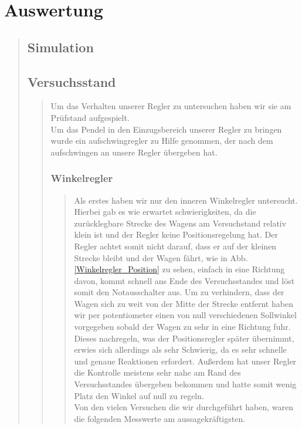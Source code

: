 \section{Auswertung}
\begin{quote}
    
    \subsection{Simulation}
    \begin{quote}
        
    \end{quote}%
    
    
    
    
    
    \subsection{Versuchsstand}
    \begin{quote}
        
        Um das Verhalten unserer Regler zu untersuchen haben wir sie am Prüfstand aufgespielt.\\
        Um das Pendel in den Einzugsbereich unserer Regler zu bringen wurde ein aufschwingregler zu Hilfe genommen, der nach
        dem aufschwingen an unsere Regler übergeben hat.
        
        \subsubsection{Winkelregler}
        \begin{quote}
            
            Als erstes haben wir nur den inneren Winkelregler untersucht. Hierbei gab es wie erwartet schwierigkeiten, da
            die zurücklegbare Strecke des Wagens am Versuchstand relativ klein ist und der Regler keine Positionsregelung
            hat. Der Regler achtet somit nicht darauf, dass er auf der kleinen Strecke bleibt und der Wagen fährt, wie in
            Abb. \ref{Winkelregler_Position} zu sehen, einfach in eine Richtung davon, kommt schnell ans Ende
            des Versuchsstandes und löst somit den Notausschalter aus. Um zu verhindern, dass der Wagen sich zu weit von der
            Mitte der Strecke entfernt haben wir per potentiometer einen von null verschiedenen Sollwinkel vorgegeben sobald der Wagen
            zu sehr in eine Richtung fuhr.
            Dieses nachregeln, was der Positionsregler später übernimmt, erwies sich allerdings als sehr Schwierig, da es
            sehr schnelle und genaue Reaktionen erfordert. Außerdem hat unser Regler die Kontrolle meistens sehr nahe am
            Rand des Versuchsstandes übergeben bekommen und hatte somit wenig Platz den Winkel auf null zu regeln.\\
            Von den vielen Versuchen die wir durchgeführt haben, waren die folgenden Messwerte am aussagekräftigsten.
            

\end{quote}
\end{quote}
\end{quote}
